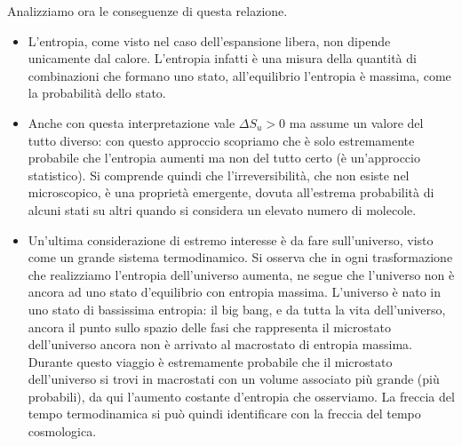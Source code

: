 \documentclass[10pt,a4paper]{article}
\begin{document}
Analizziamo ora le conseguenze di questa relazione.  
\begin{itemize}
	\item L'entropia, come visto nel caso dell'espansione libera, non dipende unicamente dal calore. L'entropia infatti è una misura della quantità di combinazioni che formano uno stato, all'equilibrio l'entropia è massima, come la probabilità dello stato. 
	\item Anche con questa interpretazione vale \(\Delta S_u > 0\) ma assume un valore del tutto diverso: con questo approccio scopriamo che è solo estremamente probabile che l'entropia aumenti ma non del tutto certo (è un'approccio statistico). Si comprende quindi che l'irreversibilità, che non esiste nel microscopico, è una proprietà emergente, dovuta all'estrema probabilità di alcuni stati su altri quando si considera un elevato numero di molecole.  
	\item Un'ultima considerazione di estremo interesse è da fare sull'universo, visto come un grande sistema termodinamico. Si osserva che in ogni trasformazione che realizziamo l'entropia dell'universo aumenta, ne segue che l'universo non è ancora ad uno stato d'equilibrio con entropia massima. L'universo è nato in uno stato di bassissima entropia: il big bang, e da tutta la vita dell'universo, ancora il punto sullo spazio delle fasi che rappresenta il microstato dell'universo ancora non è arrivato al macrostato di entropia massima. Durante questo viaggio è estremamente probabile che il microstato dell'universo si trovi in macrostati con un volume associato più grande (più probabili), da qui l'aumento costante d'entropia che osserviamo. La freccia del tempo termodinamica si può quindi identificare con la freccia del tempo cosmologica.
\end{itemize}
\end{document}
